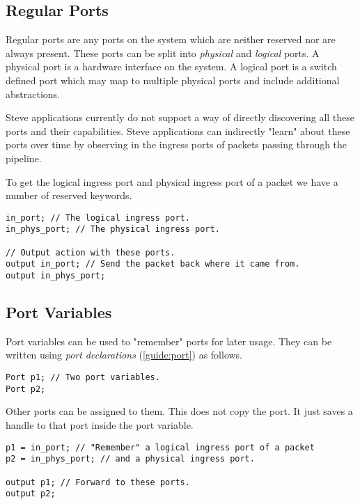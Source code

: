 \subsection{Regular Ports} \label{tut:regular_ports}

Regular ports are any ports on the system which are neither reserved nor are
always present. These ports can be split into \textit{physical} and
\textit{logical} ports. A physical port is a hardware interface on the system. A
logical port is a switch defined port which may map to multiple physical ports
and include additional abstractions.

Steve applications currently do not support a way of directly discovering all
these ports and their capabilities. Steve applications can indirectly "learn"
about these ports over time by observing in the ingress ports of packets passing
through the pipeline.

To get the logical ingress port and physical ingress port of a packet we have a
number of reserved keywords.

\begin{codepage}
\begin{lstlisting}
in_port; // The logical ingress port.
in_phys_port; // The physical ingress port.

// Output action with these ports.
output in_port; // Send the packet back where it came from.
output in_phys_port;
\end{lstlisting}
\end{codepage}

\subsection{Port Variables} \label{tut:declared_ports}

Port variables can be used to "remember" ports for later usage. They can be
written using \textit{port declarations} (\ref{guide:port}) as follows.

\begin{codepage}
\begin{lstlisting}
Port p1; // Two port variables.
Port p2;
\end{lstlisting}
\end{codepage}

Other ports can be assigned to them. This does not copy the port. It just saves
a handle to that port inside the port variable.

\begin{codepage}
\begin{lstlisting}
p1 = in_port; // "Remember" a logical ingress port of a packet
p2 = in_phys_port; // and a physical ingress port.

output p1; // Forward to these ports.
output p2;
\end{lstlisting}
\end{codepage}

